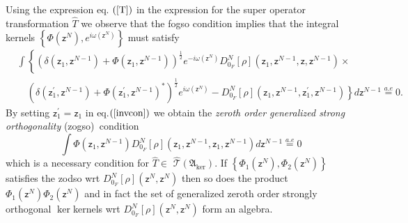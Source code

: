\documentclass[aps,preprint]{revtex4}%
\begin{document}
Using the expression eq. $\left(  \ref{T}\right)  $ in the expression for the
super operator transformation $\hat{T}$ we observe that the fogso condition
implies that the integral kernels $\left\{  \Phi\left(  \mathsf{z}^{N}\right)
,e^{i\omega\left(  \mathsf{z}^{N}\right)  }\right\}  $ must satisfy
\begin{align}
&
{\displaystyle\int}
\left\{  \left(  \delta\left(  \mathsf{z}_{1},\mathsf{z}^{N-1}\right)
+\Phi\left(  \mathsf{z}_{1},\mathsf{z}^{N-1}\right)  \right)  ^{\frac{1}{2}%
}e^{-i\omega\left(  \mathsf{z}^{N}\right)  }D_{0_{F}}^{N}\left[  \rho\right]
\left(  \mathsf{z}_{1},\mathsf{z}^{N-1},\mathsf{z},\mathsf{z}^{N-1}\right)
\times\right. \label{invcon}\\
&  \quad\left(  \delta\left(  \mathsf{z}_{1}^{\prime},\mathsf{z}^{N-1}\right)
+\Phi\left(  \mathsf{z}_{1}^{\prime},\mathsf{z}^{N-1}\right)  ^{\ast}\right)
^{\frac{1}{2}}e^{i\omega\left(  \mathsf{z}^{N}\right)  }-\left.  D_{0_{F}}%
^{N}\left[  \rho\right]  \left(  \mathsf{z}_{1},\mathsf{z}^{N-1}%
,\mathsf{z}_{1}^{\prime},\mathsf{z}^{N-1}\right)  \right\}  d\mathsf{z}%
^{N-1}\overset{a.e}{=}0.\nonumber
\end{align}
By setting $\mathsf{z}_{1}^{\prime}=\mathsf{z}_{1}$ in eq.$\left(
\ref{invcon}\right)  $ we obtain the \textit{zeroth order generalized strong
orthogonality }(zogso)\emph{\ }condition\emph{\ }%
\begin{equation}%
{\displaystyle\int}
\Phi\left(  \mathsf{z}_{1},\mathsf{z}^{N-1}\right)  D_{0_{F}}^{N}\left[
\rho\right]  \left(  \mathsf{z}_{1},\mathsf{z}^{N-1},\mathsf{z}_{1}%
,\mathsf{z}^{N-1}\right)  d\mathsf{z}^{N-1}\overset{a.e}{=}0 \label{gso}%
\end{equation}
which is a necessary condition for $\hat{T}\in$ $\mathcal{\hat{T}}\left(
\mathfrak{A}_{\ker}\right)  $. If $\left\{  \Phi_{1}\left(  \mathsf{z}%
^{N}\right)  ,\Phi_{2}\left(  \mathsf{z}^{N}\right)  \right\}  $ satisfies the
zodso wrt $D_{0_{F}}^{N}\left[  \rho\right]  \left(  \mathsf{z}^{N}%
,\mathsf{z}^{N}\right)  $ then so does the product $\Phi_{1}\left(
\mathsf{z}^{N}\right)  \Phi_{2}\left(  \mathsf{z}^{N}\right)  $ and in fact
the set of generalized zeroth order strongly orthogonal $\ker$kernels wrt
$D_{0_{F}}^{N}\left[  \rho\right]  \left(  \mathsf{z}^{N},\mathsf{z}%
^{N}\right)  $ form an algebra.
\end{document}
